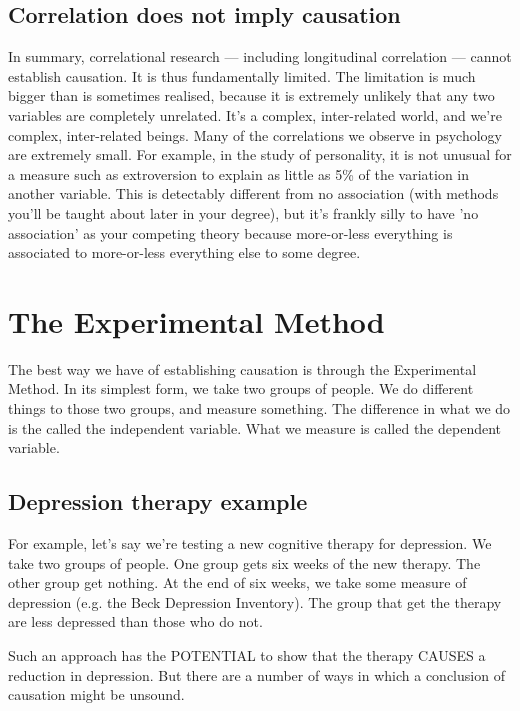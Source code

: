 \documentclass[12pt]{article}
\begin{document}
\subsection{Correlation does not imply causation}

In summary, correlational research --- including longitudinal
correlation --- cannot establish causation. It is thus fundamentally
limited. The limitation is much bigger than is sometimes realised,
because it is extremely unlikely that any two variables are completely
unrelated. It's a complex, inter-related world, and we're complex,
inter-related beings. Many of the correlations we observe in
psychology are extremely small. For example, in the study of
personality, it is not unusual for a measure such as extroversion to
explain as little as 5\% of the variation in another variable. This is
detectably different from no association (with methods you'll be
taught about later in your degree), but it's frankly silly to have 'no
association' as your competing theory because more-or-less everything
is associated to more-or-less everything else to some degree.

\section{The Experimental Method}

The best way we have of establishing causation is through the
Experimental Method. In its simplest form, we take two groups of
people. We do different things to those two groups, and measure
something. The difference in what we do is the called the independent
variable. What we measure is called the dependent variable.

\subsection{Depression therapy example}

For example, let's say we're testing a new cognitive therapy for
depression. We take two groups of people. One group gets six weeks of
the new therapy. The other group get nothing. At the end of six weeks,
we take some measure of depression (e.g. the Beck Depression
Inventory). The group that get the therapy are less depressed than
those who do not.

Such an approach has the POTENTIAL to show that the therapy CAUSES a
reduction in depression. But there are a number of ways in which a
conclusion of causation might be unsound.
\end{document}
